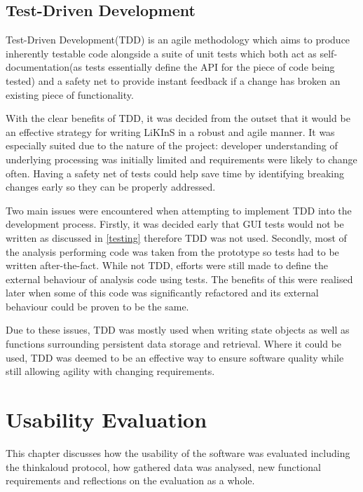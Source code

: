 \documentclass{l4proj}
\begin{document}
\section{Test-Driven Development}
Test-Driven Development(TDD) is an agile methodology which aims to produce inherently testable code alongside a suite of unit tests which both act as self-documentation(as tests essentially define the API for the piece of code being tested) and a safety net to provide instant feedback if a change has broken an existing piece of functionality.

With the clear benefits of TDD, it was decided from the outset that it would be an effective strategy for writing LiKInS in a robust and agile manner. It was especially suited due to the nature of the project: developer understanding of underlying processing was initially limited and requirements were likely to change often. Having a safety net of tests could help save time by identifying breaking changes early so they can be properly addressed.

Two main issues were encountered when attempting to implement TDD into the development process. Firstly, it was decided early that GUI tests would not be written as discussed in \ref{testing} therefore TDD was not used. Secondly, most of the analysis performing code was taken from the prototype so tests had to be written after-the-fact. While not TDD, efforts were still made to define the external behaviour of analysis code using tests. The benefits of this were realised later when some of this code was significantly refactored and its external behaviour could be proven to be the same.

Due to these issues, TDD was mostly used when writing state objects as well as functions surrounding persistent data storage and retrieval. Where it could be used, TDD was deemed to be an effective way to ensure software quality while still allowing agility with changing requirements.


\chapter{Usability Evaluation} \label{usability-evaluation}
This chapter discusses how the usability of the software was evaluated including the thinkaloud protocol, how gathered data was analysed, new functional requirements and reflections on the evaluation as a whole.
\end{document}
